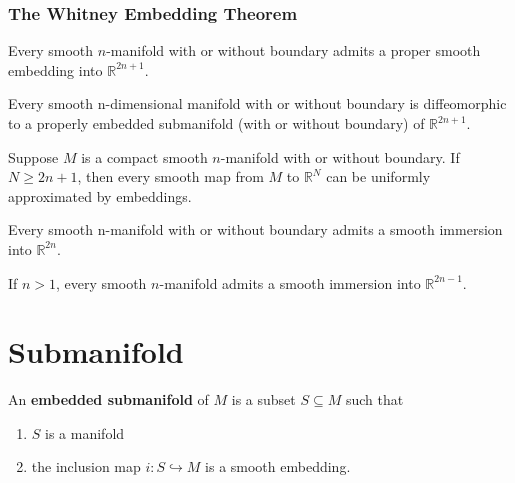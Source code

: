 \documentclass[12pt, oneside]{book}
\begin{document}
\subsubsection{The Whitney Embedding Theorem}
\begin{theorem}
    Every smooth $n$-manifold with or without boundary admits a proper smooth embedding into $\mathbb{R}^{2 n+1}$.
\end{theorem}
\begin{corollary}
    Every smooth n-dimensional manifold with or without boundary is diffeomorphic to a properly embedded submanifold (with or without boundary) of $\mathbb{R}^{2 n+1}$.
\end{corollary}


\begin{corollary}
    Suppose $M$ is a compact smooth $n$-manifold with or without boundary. If $N \geq 2 n+1$, then every smooth map from $M$ to $\mathbb{R}^N$ can be uniformly approximated by embeddings.
\end{corollary}




\begin{theorem}
    Every smooth n-manifold with or without boundary admits a smooth immersion into $\mathbb{R}^{2 n}$.
\end{theorem}

\begin{theorem}
    If $n>1$, every smooth $n$-manifold admits a smooth immersion into $\mathbb{R}^{2 n-1}$.
\end{theorem}





\section{Submanifold}

\begin{definition}
    An \textbf{embedded submanifold} of $M$ is a subset $S\subseteq M$ such that
    \begin{enumerate}
        \item $S$ is a manifold
        \item the inclusion map $i:S\hookrightarrow M$ is a smooth embedding.
    \end{enumerate}
\end{definition}
\end{document}

